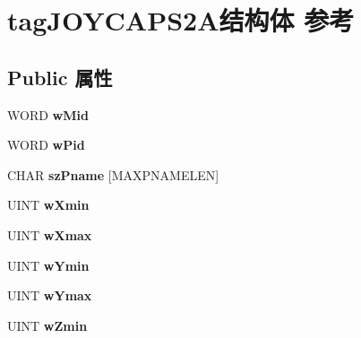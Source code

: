 \hypertarget{structtag_j_o_y_c_a_p_s2_a}{}\section{tag\+J\+O\+Y\+C\+A\+P\+S2\+A结构体 参考}
\label{structtag_j_o_y_c_a_p_s2_a}
\subsection*{Public 属性}
\begin{DoxyCompactItemize}
\item 
\mbox{\label{structtag_j_o_y_c_a_p_s2_a_a9fdaa70d7370fa7581c9e4644404c756}} 
W\+O\+RD {\bfseries w\+Mid}
\item 
\mbox{\label{structtag_j_o_y_c_a_p_s2_a_ac8b48a51f04cffd796c8fb6f49504516}} 
W\+O\+RD {\bfseries w\+Pid}
\item 
\mbox{\label{structtag_j_o_y_c_a_p_s2_a_a4fb9b33fa20f3b19dc2da988e4058fd4}} 
C\+H\+AR {\bfseries sz\+Pname} \mbox{[}M\+A\+X\+P\+N\+A\+M\+E\+L\+EN\mbox{]}
\item 
\mbox{\label{structtag_j_o_y_c_a_p_s2_a_abe47da74652fb36ef8161f596ca25beb}} 
U\+I\+NT {\bfseries w\+Xmin}
\item 
\mbox{\label{structtag_j_o_y_c_a_p_s2_a_ae75511d491c3469cb39fd9ae0c123976}} 
U\+I\+NT {\bfseries w\+Xmax}
\item 
\mbox{\label{structtag_j_o_y_c_a_p_s2_a_a8c45e9e620d0405a910cfe3911d92601}} 
U\+I\+NT {\bfseries w\+Ymin}
\item 
\mbox{\label{structtag_j_o_y_c_a_p_s2_a_a82c564974d51ed2da6d1e7d491d747c7}} 
U\+I\+NT {\bfseries w\+Ymax}
\item 
\mbox{\label{structtag_j_o_y_c_a_p_s2_a_abf46945f986a6c87be1e5109e8d06017}} 
U\+I\+NT {\bfseries w\+Zmin}
\item 
\mbox{\label{structtag_j_o_y_c_a_p_s2_a_ac81c9b458fe3d55c61376e70d9c2fe1c}} 

\end{DoxyCompactItemize}
